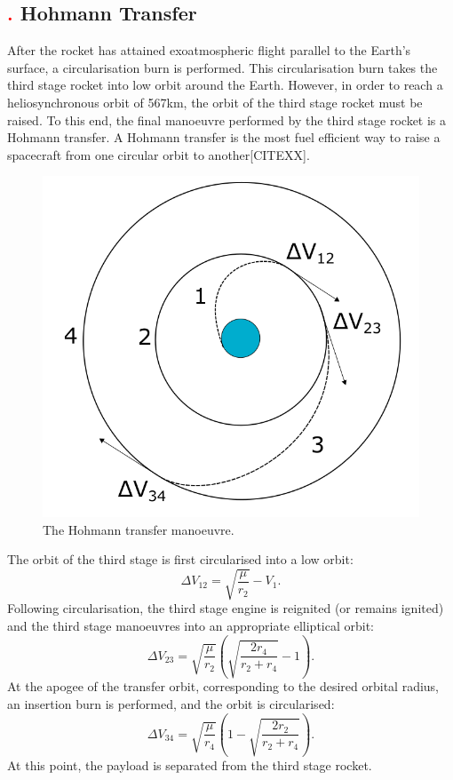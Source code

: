 \subsection{\textcolor{red}{.} Hohmann Transfer}
After the rocket has attained exoatmospheric flight parallel to the Earth's surface, a circularisation burn is performed. This circularisation burn takes the third stage rocket into low orbit around the Earth. 
However, in order to reach a heliosynchronous orbit of 567km, the orbit of the third stage rocket must be raised. 
To this end, the final manoeuvre performed by the third stage rocket is a Hohmann transfer. A Hohmann transfer is the most fuel efficient way to raise a spacecraft from one circular orbit to another[CITEXX]. 
\begin{figure}
\centering
\includegraphics[width=0.7\linewidth]{figures/4_LODESTAR/Hohmann}
\caption{The Hohmann transfer manoeuvre.}
\label{fig:Hohmann}
\end{figure}
The orbit of the third stage is first circularised into a low orbit:
\begin{equation}
\Delta V_{12} = \sqrt{\dfrac{\mu}{r_2}} - V_1.
\end{equation}
Following circularisation, the third stage engine is reignited (or remains ignited) and the third stage manoeuvres into an appropriate elliptical orbit: 
\begin{equation}
\Delta V_{23} = \sqrt{\dfrac{\mu}{r_2}} \left( \sqrt{\dfrac{2r_4}{r_2 + r_4}} -1 \right).
\end{equation}
At the apogee of the transfer orbit, corresponding to the desired orbital radius, an insertion burn is performed, and the orbit is circularised:
\begin{equation}
\Delta V_{34} = \sqrt{\dfrac{\mu}{r_4}} \left(1- \sqrt{\dfrac{2r_2}{r_2 + r_4}}  \right).
\end{equation}
At this point, the payload is separated from the third stage rocket. 

